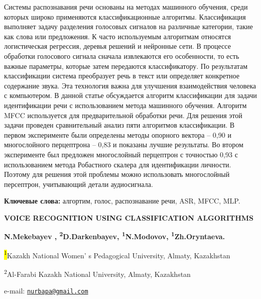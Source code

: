 Системы распознавания речи основаны на методах машинного обучения, среди
которых широко применяются классификационные алгоритмы. Классификация
выполняет задачу разделения голосовых сигналов на различные категории,
такие как слова или предложения. К часто используемым алгоритмам
относятся логистическая регрессия, деревья решений и нейронные сети. В
процессе обработки голосового сигнала сначала извлекаются его
особенности, то есть важные параметры, которые затем передаются
классификатору. По результатам классификации система преобразует речь в
текст или определяет конкретное содержание звука. Эта технология важна
для улучшения взаимодействия человека с компьютером. В данной статье
обсуждается алгоритм классификации для задачи идентификации речи с
использованием метода машинного обучения. Алгоритм MFCC используется для
предварительной обработки речи. Для решения этой задачи проведен
сравнительный анализ пяти алгоритмов классификации. В первом
эксперименте были определены методы опорного вектора -- 0,90 и
многослойного перцептрона -- 0,83 и показаны лучшие результаты. Во
втором эксперименте был предложен многослойный перцептрон с точностью
0,93 с использованием метода Робастного скалера для идентификации
личности. Поэтому для решения этой проблемы можно использовать
многослойный персептрон, учитывающий детали аудиосигнала.

{\bfseries Ключевые слова:} алгортим, голос, распознавание речи, ASR, MFCC,
MLP.

{\bfseries VOICE RECOGNITION USING CLASSIFICATION ALGORITHMS}

{\bfseries \textsuperscript{}N.Mekebayev \textsuperscript{\envelope },
\textsuperscript{2}D.Darkenbayev, \textsuperscript{1}N.Modovov,
\textsuperscript{1}Zh.Oryntaeva.}

\hl{\textsuperscript{1}}Kazakh National Women' s
Pedagogical University, Almaty, Kazakhstan

\textsuperscript{2}Al-Farabi Kazakh National University, Almaty,
Kazakhstan

e-mail: \href{mailto:nurbapa@gmail.com}{\nolinkurl{nurbapa@gmail.com}}

